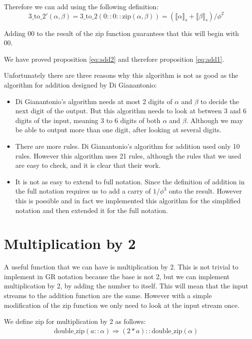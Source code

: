 \documentclass{cs4rep}
\begin{document}
Therefore we can add using the following definition:
\[\mbox{3\_to\_2}'(\alpha,\beta) = \mbox{3\_to\_2}(0::0::\mbox{zip}(\alpha,\beta)) = ( \llbracket \alpha \rrbracket_{s} + \llbracket \beta \rrbracket_{s} )/\phi^{2} \]

Adding 00 to the result of the zip function guarantees that this will
begin with 00.

We have proved proposition \ref{eq:add2} and therefore proposition
\ref{eq:add1}.

Unfortunately there are three reasons why this algorithm is not as
good as the algorithm for addition designed by Di Gianantonio:

\begin{itemize}
\item Di Gianantonio's algorithm needs at most 2 digits of $\alpha$ and
  $\beta$ to decide the next digit of the output. But this algorithm
  needs to look at between 3 and 6 digits of the input, meaning 3 to 6
  digits of both $\alpha$ and $\beta$. Although we may be able to
  output more than one digit, after looking at several digits.
\item There are more rules. Di Gianantonio's algorithm for addition used
  only 10 rules. However this algorithm uses 21 rules, although the
  rules that we used are easy to check, and it is clear that their
  work.
\item It is not as easy to extend to full notation. Since the
  definition of addition in the full notation requires us to add a
  carry of $1/\phi^{3}$ onto the result. However this is possible and
  in fact we implemented this algorithm for the simplified notation
  and then extended it for the full notation.
\end{itemize}

\section{Multiplication by 2}
A useful function that we can have is multiplication by 2. This is not
trivial to implement in GR notation because the base is not 2, but we
can implement multiplication by 2, by adding the number to itself.
This will mean that the input streams to the addition function are the
same. However with a simple modification of the zip function we only
need to look at the input stream once.

We define zip for multiplication by 2 as follows:
\[ \begin{array}{l}
\mbox{double\_zip}(a::\alpha) \Rightarrow (2*a)::\mbox{double\_zip}(\alpha)
\end{array} \] 
\end{document}
